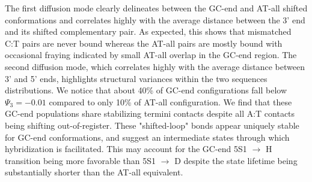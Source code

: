 \documentclass[journal=jpcbfk,manuscript=article]{achemso}
\begin{document}
The first diffusion mode clearly delineates between the GC-end and AT-all shifted conformations and correlates highly with the average distance between the 3' end and its shifted complementary pair. As expected, this shows that mismatched C:T pairs are never bound whereas the AT-all pairs are mostly bound with occasional fraying indicated by small AT-all overlap in the GC-end region. The second diffusion mode, which correlates highly with the average distance between 3' and 5' ends, highlights structural variances within the two sequences distributions. We notice that about 40\% of GC-end configurations fall below $\Psi_3 = -0.01$  compared to only 10\% of AT-all configuration. We find that these GC-end populations share stabilizing termini contacts despite all A:T contacts being shifting out-of-register. These "shifted-loop" bonds appear uniquely stable for GC-end conformations,  and suggest an intermediate states through which hybridization is facilitated. This may account for the GC-end 5S1 $\rightarrow$ H transition being more favorable than  5S1 $\rightarrow$ D despite the state lifetime being substantially shorter than the AT-all equivalent.




\end{document}

